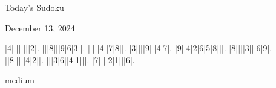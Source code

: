 \documentclass{article}
\begin{document}
\begin{center}
\Huge{Today's Sudoku}
\end{center}
\begin{center}
\Large{December 13, 2024}
\end{center}
\begin{sudoku}
|4||||||||2|.
|||8|||9|6|3||.
|||||4||7|8||.
|3||||9|||4|7|.
|9||4|2|6|5|8|||.
|8||||3|||6|9|.
||8|||||4|2||.
|||3|6||4|1|||.
|7||||2|1|||6|.
\end{sudoku}
\begin{center}
medium\end{center}
\end{document}

